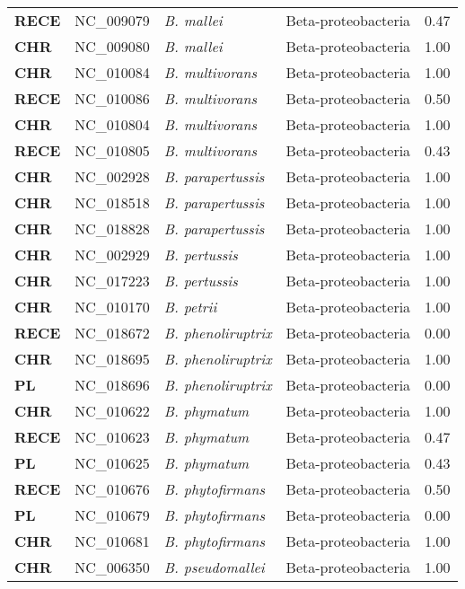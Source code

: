 \begin{adjustwidth}{-3cm}{2cm}
{\begin{supertabular}{>{\bfseries}l|p{0.1\textwidth}p{0.14\textwidth}l|l}
RECE & NC\_009079 & \textit{B. mallei} & Beta-proteobacteria & 0.47\\
CHR & NC\_009080 & \textit{B. mallei} & Beta-proteobacteria & 1.00\\
CHR & NC\_010084 & \textit{B. multivorans} & Beta-proteobacteria & 1.00\\
RECE & NC\_010086 & \textit{B. multivorans} & Beta-proteobacteria & 0.50\\
CHR & NC\_010804 & \textit{B. multivorans} & Beta-proteobacteria & 1.00\\
RECE & NC\_010805 & \textit{B. multivorans} & Beta-proteobacteria & 0.43\\
CHR & NC\_002928 & \textit{B. parapertussis} & Beta-proteobacteria & 1.00\\
CHR & NC\_018518 & \textit{B. parapertussis} & Beta-proteobacteria & 1.00\\
CHR & NC\_018828 & \textit{B. parapertussis} & Beta-proteobacteria & 1.00\\
CHR & NC\_002929 & \textit{B. pertussis} & Beta-proteobacteria & 1.00\\
CHR & NC\_017223 & \textit{B. pertussis} & Beta-proteobacteria & 1.00\\
CHR & NC\_010170 & \textit{B. petrii} & Beta-proteobacteria & 1.00\\
RECE & NC\_018672 & \textit{B. phenoliruptrix} & Beta-proteobacteria & 0.00\\
CHR & NC\_018695 & \textit{B. phenoliruptrix} & Beta-proteobacteria & 1.00\\
PL & NC\_018696 & \textit{B. phenoliruptrix} & Beta-proteobacteria & 0.00\\
CHR & NC\_010622 & \textit{B. phymatum} & Beta-proteobacteria & 1.00\\
RECE & NC\_010623 & \textit{B. phymatum} & Beta-proteobacteria & 0.47\\
PL & NC\_010625 & \textit{B. phymatum} & Beta-proteobacteria & 0.43\\
RECE & NC\_010676 & \textit{B. phytofirmans} & Beta-proteobacteria & 0.50\\
PL & NC\_010679 & \textit{B. phytofirmans} & Beta-proteobacteria & 0.00\\
CHR & NC\_010681 & \textit{B. phytofirmans} & Beta-proteobacteria & 1.00\\
CHR & NC\_006350 & \textit{B. pseudomallei} & Beta-proteobacteria & 1.00\\

\end{supertabular}}
\end{adjustwidth}
